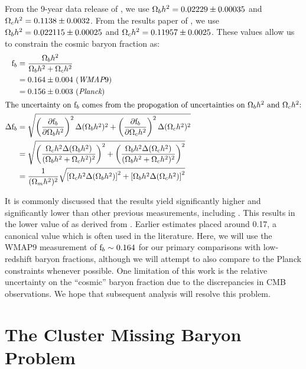 From the 9-year data release of \WMAP{} \citep[,][]{Hinshaw2013},
we use $\Omega_b h^2 = 0.02229 \pm 0.00035$ and $\Omega_c h^2 =
0.1138 \pm 0.0032$. From the results paper of \Planck{}
\citep{PlanckResultsXVI}, we use $\Omega_b h^2 = 0.022115
\pm 0.00025$ and $\Omega_c h^2 = 0.11957 \pm 0.0025$. These values
allow us to constrain the cosmic baryon fraction as:
\begin{align}
\textrm{f\ensuremath{_b}} &= \frac{\Omega_b h^2}{\Omega_b h^2 + \Omega_c h^2} \\
&=0.164 \pm 0.004 \,\,(\textit{WMAP}9) \nonumber\\
&= 0.156 \pm 0.003\,\,(\textit{Planck}) \nonumber\\ 
\intertext{The uncertainty on \textrm{f\ensuremath{_b}}{} comes from the propogation of
  uncertainties on $\Omega_b h^2$ and $\Omega_c h^2$:}
\Delta\textrm{f\ensuremath{_b}} &=
\sqrt{\left(\frac{\partial\textrm{f\ensuremath{_b}}}{\partial\Omega_b h^2}\right)^2\Delta(\Omega_b h^2)^2 
+ \left(\frac{\partial\textrm{f\ensuremath{_b}}}{\partial\Omega_c h^2}\right)^2\Delta(\Omega_c h^2)^2} \nonumber \\
&= \sqrt{\left(\frac{\Omega_c h^2 \Delta(\Omega_b h^2)}{(\Omega_b h^2 + \Omega_c h^2)^2}\right)^2
+ \left(\frac{\Omega_b h^2 \Delta(\Omega_c h^2)}{(\Omega_b h^2 + \Omega_c h^2)^2}\right)^2} \nonumber \\
&= \frac{1}{(\Omega_m h^2)^2}\sqrt{\left[\Omega_c h^2 \Delta(\Omega_b h^2)\right]^2
+ \left[\Omega_b h^2 \Delta(\Omega_c h^2)\right]^2} 
\end{align}

It is commonly discussed  that the \Planck{}
results yield \omegam{} significantly higher and \Ho{} significantly
lower than other previous measurements, including \WMAP{}. This
results in the lower value of \fb{} as derived from \Planck{}. Earlier
estimates \citep[e.g.,,][]{Dunkley2009} placed \fb{} around
0.17, a canonical value which is often used in the literature. Here,
we will use the WMAP9 measurement of $\textrm{f\ensuremath{_b}}{}\sim0.164$ for our primary
comparisons with low-redshift baryon fractions, although we will
attempt to also compare to the Planck constraints whenever
possible. One limitation of this work is the relative uncertainty on
the ``cosmic'' baryon fraction due to the discrepancies in CMB
observations. We hope that subsequent analysis will resolve this
problem.



\section{The Cluster Missing Baryon Problem}
\label{sec:Missing.Clusters}

